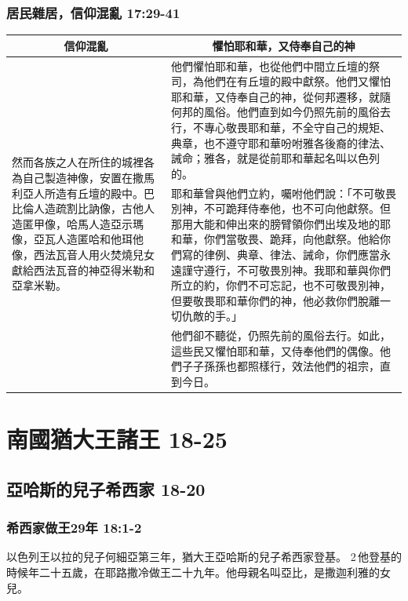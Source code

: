 \subsubsection{居民雜居，信仰混亂 17:29-41 }
\begin{table}[H]
\centering
\begin{tabular}{p{3.5cm}||p{13.5cm}}\hline\hline
\multicolumn{1}{c|}{信仰混亂}&\multicolumn{1}{c}{懼怕耶和華，又侍奉自己的神}\\\hline
\multirow{3}{3.6cm}{然而各族之人在所住的城裡各為自己製造神像，安置在撒馬利亞人所造有丘壇的殿中。巴比倫人造疏割比訥像，古他人造匿甲像，哈馬人造亞示瑪像，亞瓦人造匿哈和他珥他像，西法瓦音人用火焚燒兒女獻給西法瓦音的神亞得米勒和亞拿米勒。}
&他們懼怕耶和華，也從他們中間立丘壇的祭司，為他們在有丘壇的殿中獻祭。他們又懼怕耶和華，又侍奉自己的神，從何邦遷移，就隨何邦的風俗。他們直到如今仍照先前的風俗去行，不專心敬畏耶和華，不全守自己的規矩、典章，也不遵守耶和華吩咐雅各後裔的律法、誡命；雅各，就是從前耶和華起名叫以色列的。\\\cline{2-2}
&耶和華曾與他們立約，囑咐他們說：「不可敬畏別神，不可跪拜侍奉他，也不可向他獻祭。但那用大能和伸出來的膀臂領你們出埃及地的耶和華，你們當敬畏、跪拜，向他獻祭。他給你們寫的律例、典章、律法、誡命，你們應當永遠謹守遵行，不可敬畏別神。我耶和華與你們所立的約，你們不可忘記，也不可敬畏別神，但要敬畏耶和華你們的神，他必救你們脫離一切仇敵的手。」\\\cline{2-2} 
&他們卻不聽從，仍照先前的風俗去行。如此，這些民又懼怕耶和華，又侍奉他們的偶像。他們子子孫孫也都照樣行，效法他們的祖宗，直到今日。\\\hline
\end{tabular}
\end{table}


\section{南國猶大王諸王 18-25 }

\subsection{亞哈斯的兒子希西家 18-20 }
\subsubsection{希西家做王29年 18:1-2}
以色列王以拉的兒子何細亞第三年，猶大王亞哈斯的兒子希西家登基。 2 他登基的時候年二十五歲，在耶路撒冷做王二十九年。他母親名叫亞比，是撒迦利雅的女兒。


